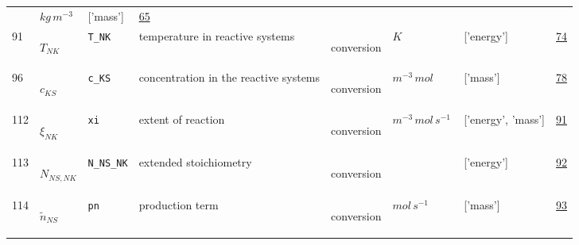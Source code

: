 \begin{longtable}{|p{1cm}|p{3cm}|p{3cm}|p{7cm}|p{3.0cm}|p{3cm}|p{2cm}|p{1cm}|}
             & $ kg \,m^{-3} \, $
             & ['mass']
             & \hyperlink{"e:65"}{ 65 }
                 \\
    91
             & \hypertarget{"v:91"}{ $ {T}_{{N K}} $}
             & \verb|T_NK|
             & temperature in reactive systems
             & \begin{lay}conversion \end{lay}
             & $ K \, $
             & ['energy']
             & \hyperlink{"e:74"}{ 74 }
                 \\
    96
             & \hypertarget{"v:96"}{ $ {c}_{{K S}} $}
             & \verb|c_KS|
             & concentration in the reactive systems
             & \begin{lay}conversion \end{lay}
             & $ m^{-3} \,mol \, $
             & ['mass']
             & \hyperlink{"e:78"}{ 78 }
                 \\
    112
             & \hypertarget{"v:112"}{ $ {\xi}_{{N K}} $}
             & \verb|xi|
             & extent of reaction
             & \begin{lay}conversion \end{lay}
             & $ m^{-3} \,mol \,s^{-1} \, $
             & ['energy', 'mass']
             & \hyperlink{"e:91"}{ 91 }
                 \\
    113
             & \hypertarget{"v:113"}{ $ {N}_{{N S}, {N K}} $}
             & \verb|N_NS_NK|
             & extended stoichiometry
             & \begin{lay}conversion \end{lay}
             & $  $
             & ['energy']
             & \hyperlink{"e:92"}{ 92 }
                 \\
    114
             & \hypertarget{"v:114"}{ $ {\tilde{n}}_{{N S}} $}
             & \verb|pn|
             & production term
             & \begin{lay}conversion \end{lay}
             & $ mol \,s^{-1} \, $
             & ['mass']
             & \hyperlink{"e:93"}{ 93 }
                 \\
    \end{longtable}